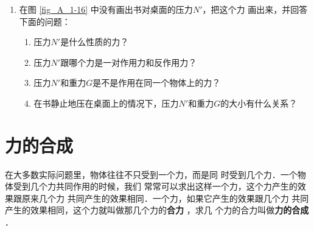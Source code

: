 \begin{enumerate}
\item  在图 \ref{fig_A_1-16} 中没有画出书对桌面的压力$N'$，把这个力
画出来，并回答下面的问题：
\begin{enumerate} 
\item 压力$N'$是什么性质的力？
\item 压力$N'$跟哪个力是一对作用力和反作用力？
\item 压力$N'$和重力$G$是不是作用在同一个物体上的力？
\item 在书静止地压在桌面上的情况下，压力$N'$和重力$G$的大小有什么关系？
\end{enumerate} 


\end{enumerate} 

\section{力的合成} 

    在大多数实际问题里，物体往往不只受到一个力，而是同
时受到几个力．一个物体受到几个力共同作用的时候，我们
常常可以求出这样一个力，这个力产生的效果跟原来几个力
共同产生的效果相同．一个力，如果它产生的效果跟几个力
共同产生的效果相同，这个力就叫做那几个力的\textbf{合力} ，求几
个力的合力叫做\textbf{力的合成} ． 


